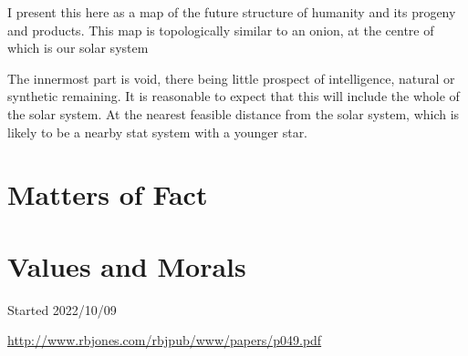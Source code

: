 \documentclass[10pt,titlepage]{article}
\begin{document}
I present this here as a map of the future structure of humanity and its progeny and products.
This map is topologically similar to an onion, at the centre of which is our solar system

The innermost part is void, there being little prospect of intelligence, natural or synthetic remaining.
It is reasonable to expect that this will include the whole of the solar system.
At the nearest feasible distance from the solar system, which is likely to be a nearby stat system with a younger star.



\section{Matters of Fact}


\section{Values and Morals}


{}





\tiny{
Started 2022/10/09

\href{http://www.rbjones.com/rbjpub/www/papers/p049.pdf}{http://www.rbjones.com/rbjpub/www/papers/p049.pdf}

}%
\end{document}
